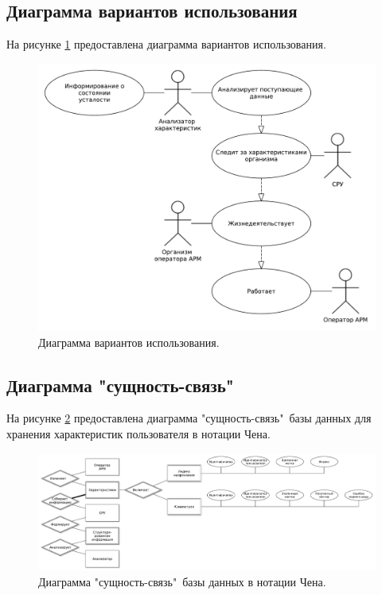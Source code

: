 \subsection{Диаграмма вариантов использования}
На рисунке \ref{fig:useCase} предоставлена диаграмма вариантов использования.
\begin{figure}[H]
	\centering
	\includegraphics[width=\textwidth]{img/useCaseDiagramPresentation.pdf}
	\caption{Диаграмма вариантов использования.}
	\label{fig:useCase}
\end{figure}


\subsection{Диаграмма "сущность-связь"\ }
На рисунке \ref{fig:chen} предоставлена диаграмма "сущность-связь"\ базы данных для хранения характеристик пользователя в нотации Чена.
\begin{figure}[H]
	\centering
	\includegraphics[width=\textwidth]{img/chenERDiagram.pdf}
	\caption{Диаграмма "сущность-связь"\ базы данных в нотации Чена.}
	\label{fig:chen}
\end{figure}

